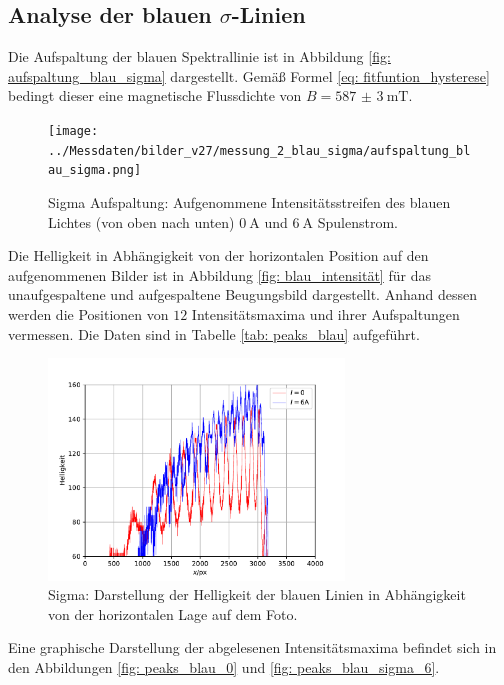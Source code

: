 \subsection{Analyse der blauen $\sigma$-Linien}
Die Aufspaltung der blauen Spektrallinie ist in Abbildung \ref{fig: aufspaltung_blau_sigma} dargestellt. Gemäß Formel \eqref{eq: fitfuntion_hysterese}
bedingt dieser eine magnetische Flussdichte von $B = \SI{587(3)}{\milli\tesla}$.
\begin{figure}
  \centering
  \texttt{[image: ../Messdaten/bilder\_v27/messung\_2\_blau\_sigma/aufspaltung\_blau\_sigma.png]}
  \caption{Sigma Aufspaltung: Aufgenommene Intensitätsstreifen des blauen Lichtes (von oben nach unten) $\SI{0}{\ampere}$ und $\SI{6}{\ampere}$ Spulenstrom.}
  \label{fig: aufspaltung_blau}
\end{figure}
Die Helligkeit in Abhängigkeit von der horizontalen Position auf den aufgenommenen Bilder ist in Abbildung \ref{fig: blau_intensität} für das unaufgespaltene
und aufgespaltene Beugungsbild dargestellt. Anhand dessen werden die Positionen von $12$ Intensitätsmaxima und ihrer Aufspaltungen
vermessen. Die Daten sind in Tabelle \ref{tab: peaks_blau} aufgeführt.
\begin{figure}
  \centering
  \includegraphics[width = 0.7\textwidth]{../Messdaten/plots/blau_sigma_intensitaet.pdf}
  \caption{Sigma: Darstellung der Helligkeit der blauen Linien in Abhängigkeit von der horizontalen Lage auf dem Foto.}
  \label{fig: blau_intensität_sigma}
\end{figure}

Eine graphische Darstellung der abgelesenen Intensitätsmaxima befindet sich in den Abbildungen \ref{fig: peaks_blau_0} und \ref{fig: peaks_blau_sigma_6}.
